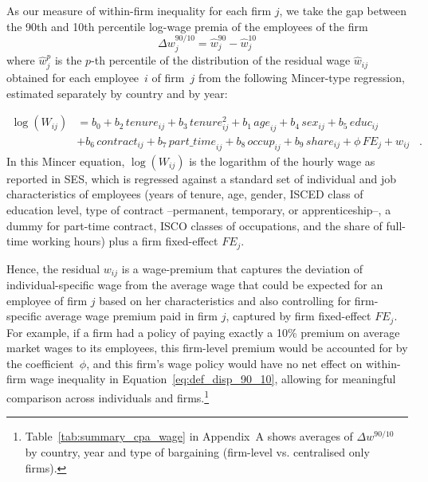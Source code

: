 \documentclass[12pt]{article}
\begin{document}
As our measure of within-firm inequality for each firm $j$, we take the gap between the 90th and 10th percentile log-wage premia of the employees of the firm
\begin{equation}
  \label{eq:def_disp_90_10}
  \Delta w^{90/10}_j=\hat{w}^{90}_j - \hat{w}^{10}_j
\end{equation}
\noindent where $\hat{w}^p_j$ is the $p$-th percentile of the distribution of the residual wage $\hat{w}_{ij}$ obtained for each employee~$i$ of firm~$j$ from the following Mincer-type regression, estimated separately by country and by year:

\begin{equation}
\label{eq:mincer}
\begin{split}
\log \left(W_{ij} \right)
&= b_0 + b_2\,\mathit{tenure}_{ij} + b_3\,\mathit{tenure}_{ij}^2 + b_1\,\mathit{age}_{ij} + b_4\,\mathit{sex}_{ij} + b_5\,\mathit{educ}_{ij} \\
&+ b_6\,\mathit{contract}_{ij} + b_7\,\mathit{part\_time}_{ij} + b_8\,\mathit{occup}_{ij} + b_9\,\mathit{share}_{ij} + \phi \,\mathit{FE}_j + w_{ij} \;\;\;.
\end{split}
\end{equation}
In this Mincer equation, $\log \left(W_{ij} \right)$ is the logarithm of the hourly wage as reported in SES, which is regressed against a standard set of individual and job characteristics of employees (years of tenure, age, gender, ISCED class of education level, type of contract --permanent, temporary, or apprenticeship--, a dummy for part-time contract, ISCO classes of occupations, and the share of full-time working hours) plus a firm fixed-effect $\mathit{FE}_j$. 

Hence, the residual $w_{ij}$ is a wage-premium that captures the deviation of individual-specific wage from the average wage that could be expected for an employee of firm $j$ based on her characteristics and also controlling for firm-specific average wage premium paid in firm $j$, captured by firm fixed-effect $\mathit{FE}_j$. For example, if a firm had a policy of paying exactly a 10\% premium on average market wages to its employees, this firm-level premium would be accounted for by the coefficient~$\phi$, and this firm's wage policy would have no net effect on within-firm wage inequality in Equation~\eqref{eq:def_disp_90_10}, allowing for meaningful comparison across individuals and firms.\footnote{Table~\ref{tab:summary_cpa_wage} in Appendix~A shows averages of $\Delta w^{90/10}$ by country, year and type of bargaining (firm-level vs. centralised only firms).} 
\end{document}

